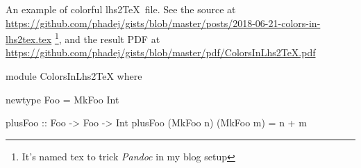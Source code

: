 \documentclass{article}
\begin{document}
An example of colorful lhs2\TeX\ file.
See the source at \url{https://github.com/phadej/gists/blob/master/posts/2018-06-21-colors-in-lhs2tex.tex}%
\footnote{It's named tex to trick \emph{Pandoc} in my blog setup},
and the result PDF at \url{https://github.com/phadej/gists/blob/master/pdf/ColorsInLhs2TeX.pdf}

\begin{code}
module ColorsInLhs2TeX where

newtype Foo = MkFoo Int

plusFoo :: Foo -> Foo -> Int
plusFoo (MkFoo n) (MkFoo m) = n + m
\end{code}
\end{document}
